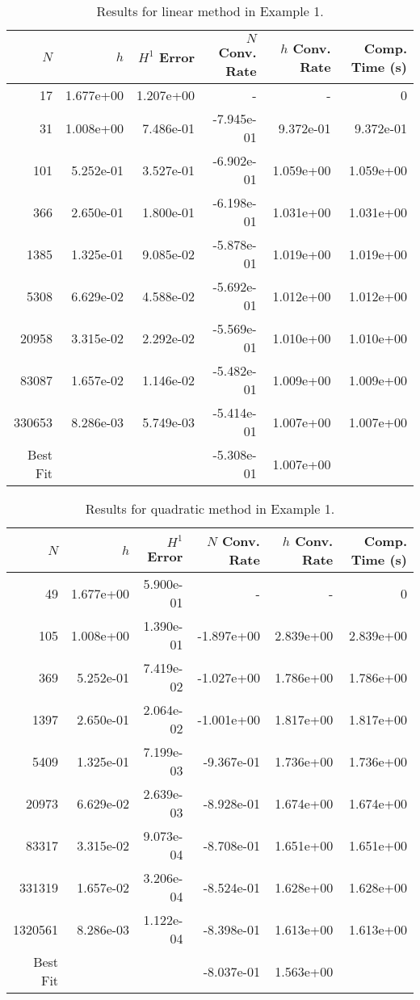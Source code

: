 \documentclass{article}
\begin{document}
\begin{table}
\begin{tabular}{|r|r|r|r|r|r|}
\hline
$N$&$h$&$H^1$ Error&$N$ Conv. Rate &$h$ Conv. Rate&Comp. Time (s)\\ 
\hline
\hline
17&1.677e+00&1.207e+00&-&-&0\\ 
31&1.008e+00&7.486e-01&-7.945e-01&9.372e-01&9.372e-01\\ 
101&5.252e-01&3.527e-01&-6.902e-01&1.059e+00&1.059e+00\\ 
366&2.650e-01&1.800e-01&-6.198e-01&1.031e+00&1.031e+00\\ 
1385&1.325e-01&9.085e-02&-5.878e-01&1.019e+00&1.019e+00\\ 
5308&6.629e-02&4.588e-02&-5.692e-01&1.012e+00&1.012e+00\\ 
20958&3.315e-02&2.292e-02&-5.569e-01&1.010e+00&1.010e+00\\ 
83087&1.657e-02&1.146e-02&-5.482e-01&1.009e+00&1.009e+00\\ 
330653&8.286e-03&5.749e-03&-5.414e-01&1.007e+00&1.007e+00\\
\hline 
Best Fit&&&-5.308e-01&1.007e+00&\\ 
\hline
\end{tabular}
\caption{Results for linear method in Example 1.}
\label{tab:example1-linear}
\end{table}


\begin{table}
\begin{tabular}{|r|r|r|r|r|r|}
\hline
$N$&$h$&$H^1$ Error&$N$ Conv. Rate &$h$ Conv. Rate&Comp. Time (s)\\ 
\hline
\hline
49&1.677e+00&5.900e-01&-&-&0\\ 
105&1.008e+00&1.390e-01&-1.897e+00&2.839e+00&2.839e+00\\ 
369&5.252e-01&7.419e-02&-1.027e+00&1.786e+00&1.786e+00\\ 
1397&2.650e-01&2.064e-02&-1.001e+00&1.817e+00&1.817e+00\\ 
5409&1.325e-01&7.199e-03&-9.367e-01&1.736e+00&1.736e+00\\ 
20973&6.629e-02&2.639e-03&-8.928e-01&1.674e+00&1.674e+00\\ 
83317&3.315e-02&9.073e-04&-8.708e-01&1.651e+00&1.651e+00\\ 
331319&1.657e-02&3.206e-04&-8.524e-01&1.628e+00&1.628e+00\\ 
1320561&8.286e-03&1.122e-04&-8.398e-01&1.613e+00&1.613e+00\\
\hline 
Best Fit&&&-8.037e-01&1.563e+00&\\ 
\hline
\end{tabular}
\caption{Results for quadratic method in Example 1.}
\label{tab:example1-quadratic}
\end{table}
\end{document}
